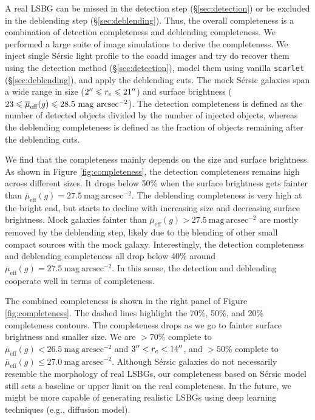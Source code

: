 \documentclass[twocolumn,astrosymb,twocolappendix]{aastex631}
\newcommand{\sbunit}{\mathrm{mag\ arcsec}^{-2}}
\newcommand{\sbeff}{\overline{\mu}_{\mathrm{eff}}(g)}
\newcommand{\code}[1]{\texttt{#1}}
\newcommand{\sersic}{S\'ersic}
\begin{document}
\begin{CJK*}{UTF8}{gbsn}
A real LSBG can be missed in the detection step (\S \ref{sec:detection}) or be excluded in the deblending step (\S \ref{sec:deblending}). Thus, the overall completeness is a combination of detection completeness and deblending completeness. We performed a large suite of image simulations to derive the completeness. We inject single \sersic{} light profile \citep{Sersic1963} to the coadd images and try do recover them using the detection method (\S\ref{sec:detection}), model them using vanilla \code{scarlet} (\S\ref{sec:deblending}), and apply the deblending cuts. The mock \sersic{} galaxies span a wide range in size ($2\mbox{$^{\prime\prime}$} \leqslant r_{e} \leqslant 21\mbox{$^{\prime\prime}$}$) and surface brightness ($23 \leqslant \overline{\mu}_{\rm eff}(g) \leqslant 28.5\ \mathrm{mag\ arcsec^{-2}}$). The detection completeness is defined as the number of detected objects divided by the number of injected objects, whereas the deblending completeness is defined as the fraction of objects remaining after the deblending cuts. 

We find that the completeness mainly depends on the size and surface brightness. As shown in Figure \ref{fig:completeness}, the detection completeness remains high across different sizes. It drops below 50\% when the surface brightness gets fainter than $\sbeff = 27.5\ \sbunit$. The deblending completeness is very high at the bright end, but starts to decline with increasing size and decreasing surface brightness. Mock galaxies fainter than $\sbeff > 27.5\ \sbunit$ are mostly removed by the deblending step, likely due to the blending of other small compact sources with the mock galaxy. Interestingly, the detection completeness and deblending completeness all drop below 40\% around $\sbeff=27.5\ \sbunit$. In this sense, the detection and deblending cooperate well in terms of completeness. 

The combined completeness is shown in the right panel of Figure \ref{fig:completeness}. The dashed lines highlight the 70\%, 50\%, and 20\% completeness contours. The completeness drops as we go to fainter surface brightness and smaller size. We are $>70\%$ complete to $\sbeff < 26.5\ \sbunit$ and $3\mbox{$^{\prime\prime}$} < r_e < 14\mbox{$^{\prime\prime}$}$, and $>50\%$ complete to $\sbeff \leqslant 27.0\ \sbunit$. Although \sersic{} galaxies do not necessarily resemble the morphology of real LSBGs, our completeness based on \sersic{} model still sets a baseline or upper limit on the real completeness. In the future, we might be more capable of generating realistic LSBGs using deep learning techniques (e.g., diffusion model). 


\end{CJK*}
\end{document}
